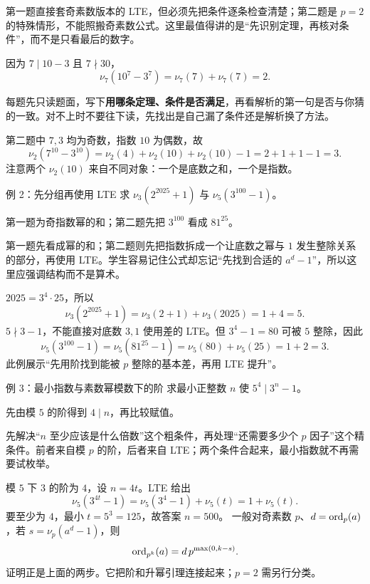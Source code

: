 \begin{pitfall}[讲解：先看这题到底在做什么]
第一题直接套奇素数版本的 LTE，但必须先把条件逐条检查清楚；第二题是 $p=2$ 的特殊情形，不能照搬奇素数公式。这里最值得讲的是“先识别定理，再核对条件”，而不是只看最后的数字。
\end{pitfall}

\sol 因为 $7\mid10-3$ 且 $7\nmid30$，
\[
 \nu_7(10^7-3^7)=\nu_7(7)+\nu_7(7)=2.
\]

\begin{tip}[怎么用一节里的例题]
每题先只读题面，写下\textbf{用哪条定理、条件是否满足}，再看解析的第一句是否与你猜的一致。对不上时不要往下读，先找出是自己漏了条件还是解析换了方法。
\end{tip}

第二题中 $7,3$ 均为奇数，指数 $10$ 为偶数，故
\[
 \nu_2(7^{10}-3^{10})=\nu_2(4)+\nu_2(10)+\nu_2(10)-1=2+1+1-1=3.
\]
注意两个 $\nu_2(10)$ 来自不同对象：一个是底数之和，一个是指数。


\begin{problem}{例 2：先分组再使用 LTE}
求 $\nu_3(2^{2025}+1)$ 与 $\nu_5(3^{100}-1)$。
\end{problem}
\hint 第一题为奇指数幂的和；第二题先把 $3^{100}$ 看成 $81^{25}$。

\begin{pitfall}[讲解：先看这题到底在做什么]
第一题先看成幂的和；第二题则先把指数拆成一个让底数之幂与 $1$ 发生整除关系的部分，再使用 LTE。学生容易记住公式却忘记“先找到合适的 $a^d-1$”，所以这里应强调结构而不是算术。
\end{pitfall}

\sol $2025=3^4\cdot25$，所以
\[
\nu_3(2^{2025}+1)=\nu_3(2+1)+\nu_3(2025)=1+4=5.
\]
$5\nmid3-1$，不能直接对底数 $3,1$ 使用差的 LTE。但 $3^4-1=80$ 可被 $5$ 整除，因此
\[
\nu_5(3^{100}-1)=\nu_5(81^{25}-1)=\nu_5(80)+\nu_5(25)=1+2=3.
\]
此例展示“先用阶找到能被 $p$ 整除的基本差，再用 LTE 提升”。


\begin{problem}{例 3：最小指数与素数幂模数下的阶}
求最小正整数 $n$ 使 $5^4\mid3^n-1$。
\end{problem}
\hint 先由模 $5$ 的阶得到 $4\mid n$，再比较赋值。

\begin{pitfall}[讲解：先看这题到底在做什么]
先解决“$n$ 至少应该是什么倍数”这个粗条件，再处理“还需要多少个 $p$ 因子”这个精条件。前者来自模 $p$ 的阶，后者来自 LTE；两个条件合起来，最小指数就不再需要试枚举。
\end{pitfall}

\sol 模 $5$ 下 $3$ 的阶为 $4$，设 $n=4t$。LTE 给出
\[
 \nu_5(3^{4t}-1)=\nu_5(3^4-1)+\nu_5(t)=1+\nu_5(t).
\]
要至少为 $4$，最小 $t=5^3=125$，故答案 $n=500$。
一般对奇素数 $p$、$d=\operatorname{ord}_p(a)$，若 $s=\nu_p(a^d-1)$，则
\[
 \operatorname{ord}_{p^k}(a)=d\,p^{\max(0,k-s)}.
\]
证明正是上面的两步。它把阶和升幂引理连接起来；$p=2$ 需另行分类。



